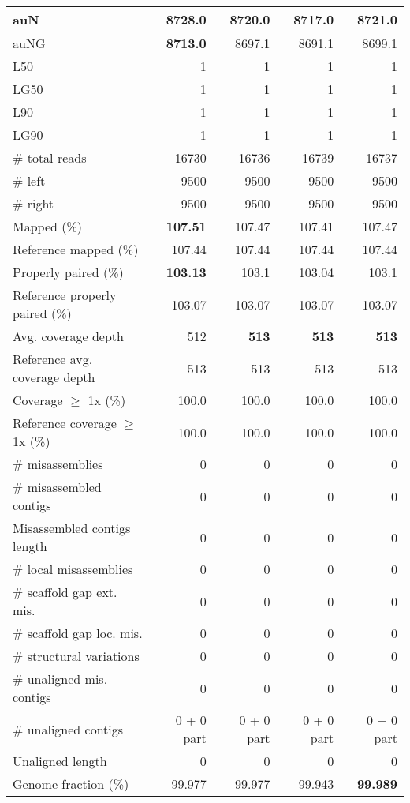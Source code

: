 \documentclass[12pt,a4paper]{article}
\begin{document}
\begin{table}[ht]
\begin{center}
\begin{tabular}{|l*{4}{|r}|}
auN & {\bf 8728.0} & 8720.0 & 8717.0 & 8721.0 \\ \hline
auNG & {\bf 8713.0} & 8697.1 & 8691.1 & 8699.1 \\ \hline
L50 & 1 & 1 & 1 & 1 \\ \hline
LG50 & 1 & 1 & 1 & 1 \\ \hline
L90 & 1 & 1 & 1 & 1 \\ \hline
LG90 & 1 & 1 & 1 & 1 \\ \hline
\# total reads & 16730 & 16736 & 16739 & 16737 \\ \hline
\# left & 9500 & 9500 & 9500 & 9500 \\ \hline
\# right & 9500 & 9500 & 9500 & 9500 \\ \hline
Mapped (\%) & {\bf 107.51} & 107.47 & 107.41 & 107.47 \\ \hline
Reference mapped (\%) & 107.44 & 107.44 & 107.44 & 107.44 \\ \hline
Properly paired (\%) & {\bf 103.13} & 103.1 & 103.04 & 103.1 \\ \hline
Reference properly paired (\%) & 103.07 & 103.07 & 103.07 & 103.07 \\ \hline
Avg. coverage depth & 512 & {\bf 513} & {\bf 513} & {\bf 513} \\ \hline
Reference avg. coverage depth & 513 & 513 & 513 & 513 \\ \hline
Coverage $\geq$ 1x (\%) & 100.0 & 100.0 & 100.0 & 100.0 \\ \hline
Reference coverage $\geq$ 1x (\%) & 100.0 & 100.0 & 100.0 & 100.0 \\ \hline
\# misassemblies & 0 & 0 & 0 & 0 \\ \hline
\# misassembled contigs & 0 & 0 & 0 & 0 \\ \hline
Misassembled contigs length & 0 & 0 & 0 & 0 \\ \hline
\# local misassemblies & 0 & 0 & 0 & 0 \\ \hline
\# scaffold gap ext. mis. & 0 & 0 & 0 & 0 \\ \hline
\# scaffold gap loc. mis. & 0 & 0 & 0 & 0 \\ \hline
\# structural variations & 0 & 0 & 0 & 0 \\ \hline
\# unaligned mis. contigs & 0 & 0 & 0 & 0 \\ \hline
\# unaligned contigs & 0 + 0 part & 0 + 0 part & 0 + 0 part & 0 + 0 part \\ \hline
Unaligned length & 0 & 0 & 0 & 0 \\ \hline
Genome fraction (\%) & 99.977 & 99.977 & 99.943 & {\bf 99.989} \\ \hline

\end{tabular}
\end{center}
\end{table}
\end{document}
